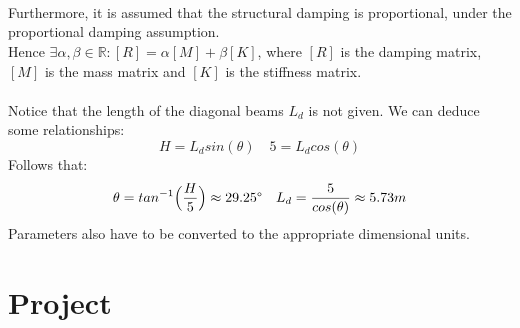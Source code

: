\documentclass[10pt,a4paper,final]{report}
\begin{document}
\\ \\ \\
Furthermore, it is assumed that the structural damping is proportional, under the proportional damping assumption.\\ Hence $\exists \alpha, \beta \in \mathbb{R} : [R] =\alpha[M]+\beta[K]$, where $[R]$ is the damping matrix, $[M]$ is the mass matrix and $[K]$ is the stiffness matrix.
\\ \\
Notice that the length of the diagonal beams $L_d$ is not given. We can deduce some relationships:
$$H = L_{d}sin(\theta) \quad 5 = L_{d}cos(\theta)$$
Follows that: 
\begin{align*}
\theta = tan^{-1}\Big(\frac{H}{5}\Big) \approx 29.25 \degree 
\quad L_{d} = \frac{5}{cos(\theta)} \approx 5.73 m
\end{align*}
Parameters also have to be converted to the appropriate dimensional units.
\newpage
\section{Project}
\end{document}
